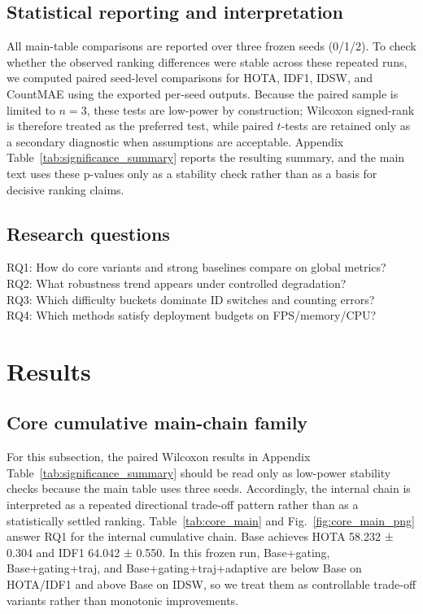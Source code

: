 \documentclass[5p,twocolumn,a4paper]{elsarticle}
\begin{document}
\subsection{Statistical reporting and interpretation}
All main-table comparisons are reported over three frozen seeds (0/1/2). To check whether the observed ranking differences were stable across these repeated runs, we computed paired seed-level comparisons for HOTA, IDF1, IDSW, and CountMAE using the exported per-seed outputs. Because the paired sample is limited to $n=3$, these tests are low-power by construction; Wilcoxon signed-rank is therefore treated as the preferred test, while paired $t$-tests are retained only as a secondary diagnostic when assumptions are acceptable. Appendix Table~\ref{tab:significance_summary} reports the resulting summary, and the main text uses these p-values only as a stability check rather than as a basis for decisive ranking claims.

\subsection{Research questions}
RQ1: How do core variants and strong baselines compare on global metrics?\\
RQ2: What robustness trend appears under controlled degradation?\\
RQ3: Which difficulty buckets dominate ID switches and counting errors?\\
RQ4: Which methods satisfy deployment budgets on FPS/memory/CPU?

\section{Results}
\subsection{Core cumulative main-chain family}
For this subsection, the paired Wilcoxon results in Appendix Table~\ref{tab:significance_summary} should be read only as low-power stability checks because the main table uses three seeds. Accordingly, the internal chain is interpreted as a repeated directional trade-off pattern rather than as a statistically settled ranking.
Table~\ref{tab:core_main} and Fig.~\ref{fig:core_main_png} answer RQ1 for the internal cumulative chain. Base achieves HOTA 58.232 ± 0.304 and IDF1 64.042 ± 0.550. In this frozen run, Base+gating, Base+gating+traj, and Base+gating+traj+adaptive are below Base on HOTA/IDF1 and above Base on IDSW, so we treat them as controllable trade-off variants rather than monotonic improvements.
\end{document}
